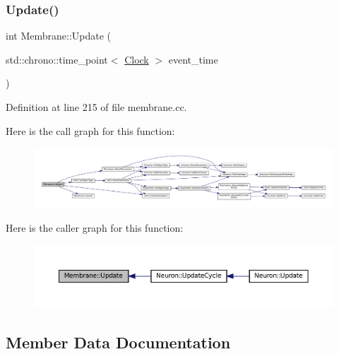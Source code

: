 \subsubsection{\texorpdfstring{Update()}{Update()}}
{\footnotesize\ttfamily int Membrane\+::\+Update (\begin{DoxyParamCaption}\item[{std\+::chrono\+::time\+\_\+point$<$ \mbox{\hyperlink{universe_8h_a0ef8d951d1ca5ab3cfaf7ab4c7a6fd80}{Clock}} $>$}]{event\+\_\+time }\end{DoxyParamCaption})}



Definition at line 215 of file membrane.\+cc.

Here is the call graph for this function\+:\nopagebreak
\begin{figure}[H]
\begin{center}
\leavevmode
\includegraphics[width=350pt]{class_membrane_a4af9710ea7f0bc6f1b6b6b6462612d51_cgraph}
\end{center}
\end{figure}
Here is the caller graph for this function\+:\nopagebreak
\begin{figure}[H]
\begin{center}
\leavevmode
\includegraphics[width=350pt]{class_membrane_a4af9710ea7f0bc6f1b6b6b6462612d51_icgraph}
\end{center}
\end{figure}


\subsection{Member Data Documentation}
\mbox{\label{class_membrane_ad41c9c20d5a1bc279f32f9001dee8c50}} 
